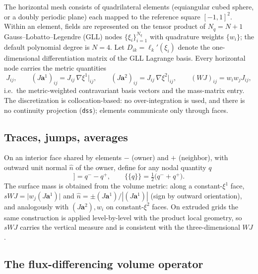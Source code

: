 \documentclass[11pt]{article}
\newcommand{\jump}[1]{[\![#1]\!]}
\newcommand{\avg}[1]{\{\!\!\{#1\}\!\!\}}
\newcommand{\Ja}[1]{(J\boldsymbol{a}^{#1})}
\begin{document}
The horizontal mesh consists of quadrilateral elements (equiangular cubed
sphere, or a doubly periodic plane) each mapped to the reference square
$[-1,1]^2$. Within an element, fields are represented on the tensor
product of $N_q = N+1$ Gauss--Lobatto--Legendre (GLL) nodes
$\{\xi_i\}_{i=1}^{N_q}$ with quadrature weights $\{w_i\}$; the default
polynomial degree is $N = 4$. Let $D_{ik} = \ell_k'(\xi_i)$ denote the
one-dimensional differentiation matrix of the GLL Lagrange basis. Every
horizontal node carries the metric quantities
\begin{equation}
J_{ij},\qquad
\Ja{1}_{ij} = J_{ij}\,\nabla\xi^1\big|_{ij},\qquad
\Ja{2}_{ij} = J_{ij}\,\nabla\xi^2\big|_{ij},
\qquad
(WJ)_{ij} = w_i w_j J_{ij},
\end{equation}
i.e.\ the metric-weighted contravariant basis vectors and the
mass-matrix entry. The discretization is collocation-based: no
over-integration is used, and there is no continuity projection
(\texttt{dss}); elements communicate only through faces.

\subsection{Traces, jumps, averages}

On an interior face shared by elements $-$ (owner) and $+$ (neighbor),
with outward unit normal $\hat n$ of the owner, define for any nodal
quantity $q$
\begin{equation}
\jump{q} = q^- - q^+,
\qquad
\avg{q} = \tfrac12\big(q^- + q^+\big).
\end{equation}
The surface mass is obtained from the volume metric: along a constant-$\xi^1$
face, $s\!W\!J = \big| w_j \Ja{1} \big|$ and
$\hat n = \pm \Ja{1}/|\Ja{1}|$ (sign by outward orientation), and
analogously with $\Ja{2}, w_i$ on constant-$\xi^2$ faces. On extruded
grids the same construction is applied level-by-level with the product
local geometry, so $s\!W\!J$ carries the vertical measure and is
consistent with the three-dimensional $WJ$.

\subsection{The flux-differencing volume operator}
\label{sec:fd}
\end{document}
